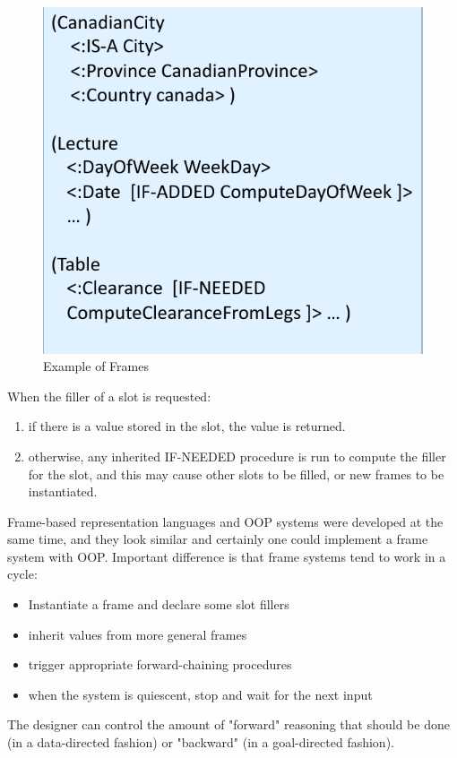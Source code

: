 \begin{figure}
	\includegraphics[width=\textwidth]{Images/frames}
	\caption{Example of Frames}
	\label{img:frames}
\end{figure}
When the filler of a slot is requested:
\begin{enumerate}
    \item if there is a value stored in the slot, the value is returned.
    \item otherwise, any inherited IF-NEEDED procedure is run to compute the filler
	  for the slot, and this may cause other slots to be filled, or new frames
	  to be instantiated.
\end{enumerate}
Frame-based representation languages and OOP systems were developed at the
same time, and they look similar and certainly one could implement 
a frame system with OOP.\newline
Important difference is that frame systems tend to work in a cycle:
\begin{itemize}
    \item Instantiate a frame and declare some slot fillers
    \item inherit values from more general frames
    \item trigger appropriate forward-chaining procedures
    \item when the system is quiescent, stop and wait for the next input
\end{itemize}
The designer can control the amount of "forward" reasoning that should be
done (in a data-directed fashion) or "backward" (in a goal-directed fashion).

